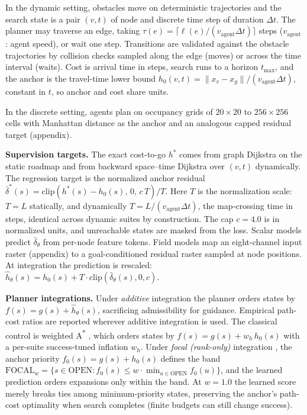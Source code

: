 \documentclass[letterpaper]{article} %
\begin{document}
In the dynamic setting, obstacles move on deterministic trajectories and the search state is a pair $(v,t)$ of node and discrete time step of duration $\Delta t$. The planner may traverse an edge, taking $\tau(e) = \lceil \ell(e) / (v_{\mathrm{agent}} \Delta t) \rceil$ steps ($v_{\mathrm{agent}}$: agent speed), or wait one step. Transitions are validated against the obstacle trajectories by collision checks sampled along the edge (moves) or across the time interval (waits). Cost is arrival time in steps, search runs to a horizon $t_{\max}$, and the anchor is the travel-time lower bound $h_0(v,t) = \lVert x_v - x_g \rVert / (v_{\mathrm{agent}} \Delta t)$, constant in $t$, so anchor and cost share units.

In the discrete setting, agents plan on occupancy grids of $20{\times}20$ to $256{\times}256$ cells with Manhattan distance as the anchor and an analogous capped residual target (appendix).

\textbf{Supervision targets.} The exact cost-to-go $h^{*}$ comes from graph Dijkstra on the static roadmap and from backward space--time Dijkstra over $(v,t)$ dynamically. The regression target is the normalized anchor residual $\bar\delta^{*}(s) = \mathrm{clip}\!\left(h^{*}(s) - h_0(s),\, 0,\, c\,T\right)/T$. Here $T$ is the normalization scale: $T{=}L$ statically, and dynamically $T = L/(v_{\mathrm{agent}}\Delta t)$, the map-crossing time in steps, identical across dynamic suites by construction. The cap $c{=}4.0$ is in normalized units, and unreachable states are masked from the loss. Scalar models predict $\bar\delta_\theta$ from per-node feature tokens. Field models map an eight-channel input raster (appendix) to a goal-conditioned residual raster sampled at node positions. At integration the prediction is rescaled: $\hat h_\theta(s) = h_0(s) + T \cdot \mathrm{clip}(\bar\delta_\theta(s), 0, c)$.

\textbf{Planner integrations.} Under \emph{additive} integration the planner orders states by $f(s) = g(s) + \hat h_\theta(s)$, sacrificing admissibility for guidance. Empirical path-cost ratios are reported wherever additive integration is used. The classical control is weighted A\textsuperscript{*} \citep{pohl1970}, which orders states by $f(s) = g(s) + w_h\, h_0(s)$ with a per-suite success-tuned inflation $w_h$. Under \emph{focal (rank-only)} integration \citep{pohl1970,pearl1982semiadmissible}, the anchor priority $f_0(s) = g(s) + h_0(s)$ defines the band $\mathrm{FOCAL}_w = \{ s \in \mathrm{OPEN} : f_0(s) \leq w \cdot \min_{u \in \mathrm{OPEN}} f_0(u) \}$, and the learned prediction orders expansions only within the band. At $w{=}1.0$ the learned score merely breaks ties among minimum-priority states, preserving the anchor's path-cost optimality when search completes (finite budgets can still change success).
\end{document}
